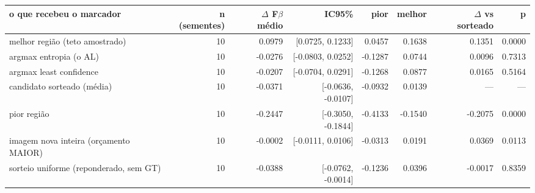 \begin{tabular}{lrrrrrrr}
\hline
o que recebeu o marcador & n (sementes) & $\Delta$ F$\beta$ médio & IC95\% & pior & melhor & $\Delta$ vs sorteado & p \\
\hline
melhor região (teto amostrado) & 10 & 0.0979 & [0.0725, 0.1233] & 0.0457 & 0.1638 & 0.1351 & 0.0000 \\
argmax entropia (o AL) & 10 & -0.0276 & [-0.0803, 0.0252] & -0.1287 & 0.0744 & 0.0096 & 0.7313 \\
argmax least confidence & 10 & -0.0207 & [-0.0704, 0.0291] & -0.1268 & 0.0877 & 0.0165 & 0.5164 \\
candidato sorteado (média) & 10 & -0.0371 & [-0.0636, -0.0107] & -0.0932 & 0.0139 & --- & --- \\
pior região & 10 & -0.2447 & [-0.3050, -0.1844] & -0.4133 & -0.1540 & -0.2075 & 0.0000 \\
imagem nova inteira (orçamento MAIOR) & 10 & -0.0002 & [-0.0111, 0.0106] & -0.0313 & 0.0191 & 0.0369 & 0.0113 \\
sorteio uniforme (reponderado, sem GT) & 10 & -0.0388 & [-0.0762, -0.0014] & -0.1236 & 0.0396 & -0.0017 & 0.8359 \\
\hline
\end{tabular}
